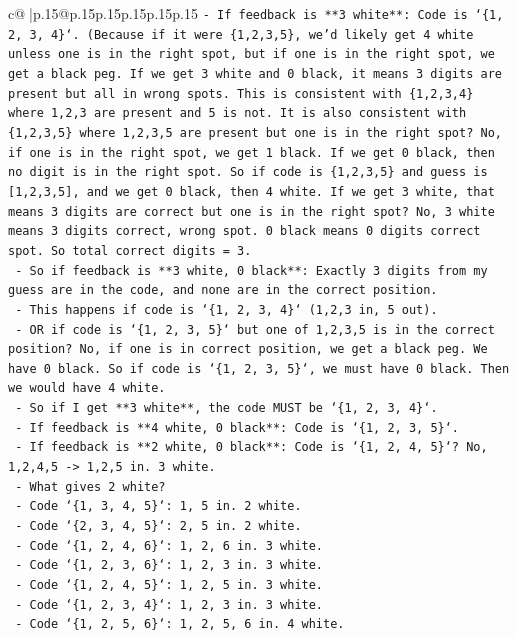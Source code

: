 \documentclass{article}
\begin{document}
{\begin{supertabular}{c@{$\;$}|p{.15\linewidth}@{}p{.15\linewidth}p{.15\linewidth}p{.15\linewidth}p{.15\linewidth}p{.15\linewidth}}
{{{\texttt{{-} If feedback is **3 white**: Code is `\{1, 2, 3, 4\}`. (Because if it were \{1,2,3,5\}, we'd likely get 4 white unless one is in the right spot, but if one is in the right spot, we get a black peg. If we get 3 white and 0 black, it means 3 digits are present but all in wrong spots. This is consistent with \{1,2,3,4\} where 1,2,3 are present and 5 is not. It is also consistent with \{1,2,3,5\} where 1,2,3,5 are present but one is in the right spot? No, if one is in the right spot, we get 1 black. If we get 0 black, then no digit is in the right spot. So if code is \{1,2,3,5\} and guess is {[}1,2,3,5{]}, and we get 0 black, then 4 white. If we get 3 white, that means 3 digits are correct but one is in the right spot? No, 3 white means 3 digits correct, wrong spot. 0 black means 0 digits correct spot. So total correct digits = 3.} \\
\texttt{  {-} So if feedback is **3 white, 0 black**: Exactly 3 digits from my guess are in the code, and none are in the correct position.} \\
\texttt{    {-} This happens if code is `\{1, 2, 3, 4\}` (1,2,3 in, 5 out).} \\
\texttt{    {-} OR if code is `\{1, 2, 3, 5\}` but one of 1,2,3,5 is in the correct position? No, if one is in correct position, we get a black peg. We have 0 black. So if code is `\{1, 2, 3, 5\}`, we must have 0 black. Then we would have 4 white.} \\
\texttt{    {-} So if I get **3 white**, the code MUST be `\{1, 2, 3, 4\}`.} \\
\texttt{  {-} If feedback is **4 white, 0 black**: Code is `\{1, 2, 3, 5\}`.} \\
\texttt{  {-} If feedback is **2 white, 0 black**: Code is `\{1, 2, 4, 5\}`? No, 1,2,4,5 {-}> 1,2,5 in. 3 white.} \\
\texttt{    {-} What gives 2 white?} \\
\texttt{    {-} Code `\{1, 3, 4, 5\}`: 1, 5 in. 2 white.} \\
\texttt{    {-} Code `\{2, 3, 4, 5\}`: 2, 5 in. 2 white.} \\
\texttt{    {-} Code `\{1, 2, 4, 6\}`: 1, 2, 6 in. 3 white.} \\
\texttt{    {-} Code `\{1, 2, 3, 6\}`: 1, 2, 3 in. 3 white.} \\
\texttt{    {-} Code `\{1, 2, 4, 5\}`: 1, 2, 5 in. 3 white.} \\
\texttt{    {-} Code `\{1, 2, 3, 4\}`: 1, 2, 3 in. 3 white.} \\
\texttt{    {-} Code `\{1, 2, 5, 6\}`: 1, 2, 5, 6 in. 4 white.} \\
}}}
\end{supertabular}}
\end{document}
